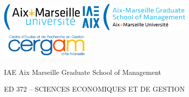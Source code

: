
\begin{titlepage}


\titlepage
{}\selectfont{}
\vspace*{-2cm}
\begin{center}
	\begin{minipage}[c]{\linewidth}
		\centering 		\includegraphics[height=1.4cm]{fig/logo_amu} \quad 		\includegraphics[height=1.4cm]{fig/logo_cotutelle} \quad \includegraphics[height=1.4cm]{fig/cergam_1.png}
	\end{minipage}\hfill 
\end{center}

\begin{flushleft}
	\vspace{0.2cm}
	\LARGE IAE Aix Marseille Graduate School of Management\\
	\LARGE %

	\Large ED 372 – SCIENCES ECONOMIQUES ET DE GESTION\\


\end{flushleft}
\end{titlepage}
